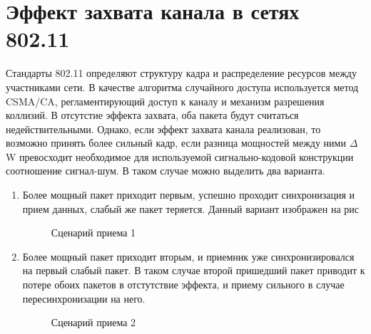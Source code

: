 \documentclass{llncs}
\begin{document}
\section{Эффект захвата канала в сетях 802.11}
Стандарты 802.11 определяют структуру кадра и распределение ресурсов между участниками сети. В качестве алгоритма случайного доступа используется метод CSMA/CA, регламентирующий  доступ к каналу и механизм разрешения коллизий. В отсутстие эффекта захвата, оба пакета будут считаться недействительными. Однако, если эффект захвата канала реализован, то возможно принять более сильный кадр, если разница мощностей между ними $\Delta$W превосходит необходимое для используемой сигнально-кодовой конструкции соотношение сигнал-шум. В таком случае можно выделить два варианта.
\begin{enumerate}
\item Более мощный пакет приходит первым, успешно проходит синхронизация и прием данных, слабый же пакет теряется. Данный вариант изображен на рис\\

\begin{figure}[]
\caption{Сценарий приема 1}
\label{ris:image}
\end{figure}

\item Более мощный пакет приходит вторым, и приемник уже синхронизировался на первый слабый пакет. В таком случае второй пришедший пакет приводит к потере обоих пакетов в отстутствие эффекта, и приему сильного в случае пересинхронизации на него.
\\
\begin{figure}[]
\caption{Сценарий приема 2}
\label{ris:image}
\end{figure}

\end{enumerate}
\end{document}
